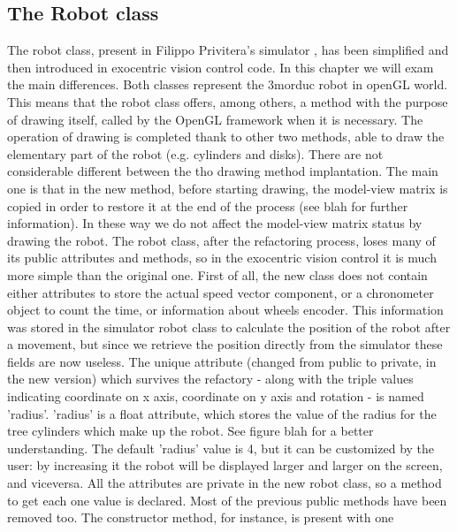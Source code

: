\subsection{The Robot class}

The robot class, present in Filippo Privitera's simulator \cite{privitera}, has been simplified and then introduced in
exocentric vision control code. In this chapter we will exam the main differences.
\newline Both classes represent the 3morduc robot in openGL world. This means that the robot class offers, among others, a
method with the purpose of drawing itself, called by the OpenGL framework when it is necessary. The operation of drawing is
completed thank to other two methods, able to draw the elementary part of the robot (e.g. cylinders and disks).
\newline There are not considerable different between the tho drawing method implantation. The main one is that in the new method,
before starting drawing, the model-view matrix is copied in order to restore it at the end of the process (see blah for further
information). In these way we do not affect the model-view matrix status by drawing the robot.
\newline The robot class, after the refactoring process, loses many of its public attributes and methods, so in the
exocentric vision control it is much more simple than the original one. First of all, the new class does not contain either
attributes to store the actual speed vector component, or a chronometer object to count the time, or information about wheels
encoder. This information was stored in the simulator robot class to calculate the position of the robot after a movement,
but since we retrieve the position directly from the simulator these fields are now useless. 
\newline The unique attribute (changed from public to private, in the new version) which survives the refactory - along with the
triple values indicating coordinate on x axis, coordinate on y axis and rotation - is named 'radius'. 'radius' is a float
attribute, which stores the value of the radius for the tree cylinders which make up the robot. See figure blah for a better
understanding. The default 'radius' value is 4, but it can be customized by the user: by increasing it the robot will be 
displayed larger and larger on the screen, and viceversa.
\newline All the attributes are private in the new robot class, so a method to get each one value is declared.
\newline Most of the previous public methods have been removed too. The constructor method, for instance, is present with one
